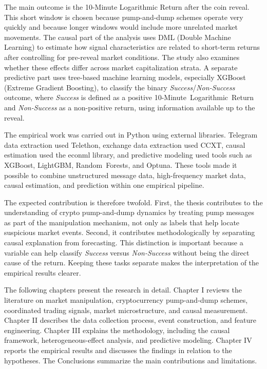 The main outcome is the 10-Minute Logarithmic Return after the coin reveal. This short window is chosen because pump-and-dump schemes operate very quickly and because longer windows would include more unrelated market movements. The causal part of the analysis uses DML (Double Machine Learning) to estimate how signal characteristics are related to short-term returns after controlling for pre-reveal market conditions. The study also examines whether these effects differ across market capitalization strata. A separate predictive part uses tree-based machine learning models, especially XGBoost (Extreme Gradient Boosting), to classify the binary \textit{Success}/\textit{Non-Success} outcome, where \textit{Success} is defined as a positive 10-Minute~Logarithmic~Return and \textit{Non-Success} as a non-positive return, using information available up to the reveal.

The empirical work was carried out in Python using external libraries. Telegram data extraction used Telethon, exchange data extraction used CCXT, causal estimation used the econml library, and predictive modeling used tools such as XGBoost, LightGBM, Random~Forests, and Optuna. These tools made it possible to combine unstructured message data, high-frequency market data, causal estimation, and prediction within one empirical pipeline.

The expected contribution is therefore twofold. First, the thesis contributes to the understanding of crypto pump-and-dump dynamics by treating pump messages as part of the manipulation mechanism, not only as labels that help locate suspicious market events. Second, it contributes methodologically by separating causal explanation from forecasting. This distinction is important because a variable can help classify \textit{Success} versus \textit{Non-Success} without being the direct cause of the return. Keeping these tasks separate makes the interpretation of the empirical results clearer.

The following chapters present the research in detail. Chapter I reviews the literature on market manipulation, cryptocurrency pump-and-dump schemes, coordinated trading signals, market microstructure, and causal measurement. Chapter II describes the data collection process, event construction, and feature engineering. Chapter III explains the methodology, including the causal framework, heterogeneous-effect analysis, and predictive modeling. Chapter IV reports the empirical results and discusses the findings in relation to the hypotheses. The Conclusions summarize the main contributions and limitations.
